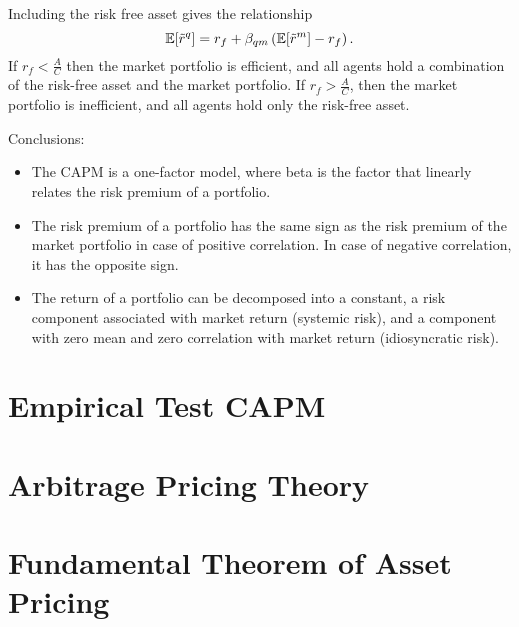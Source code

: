 \documentclass[twoside]{article}
\begin{document}
Including the risk free asset gives the relationship
\[
    \mathbb{E}[\tilde{r}^q] = r_f + \beta_{qm}\left(\mathbb{E}[\tilde{r}^m] - r_f\right).
\]
If $r_f < \frac{A}{C}$ then the market portfolio is efficient, and all agents hold a combination of the risk-free asset and the market portfolio. If $r_f > \frac{A}{C}$, then the market portfolio is inefficient, and all agents hold only the risk-free asset.

Conclusions:
\begin{itemize}
    \item The CAPM is a one-factor model, where beta is the factor that linearly relates the risk premium of a portfolio.
    \item The risk premium of a portfolio has the same sign as the risk premium of the market portfolio in case of positive correlation. In case of negative correlation, it has the opposite sign.
    \item The return of a portfolio can be decomposed into a constant, a risk component associated with market return (systemic risk), and a component with zero mean and zero correlation with market return (idiosyncratic risk).
\end{itemize}


\section{Empirical Test CAPM}


\section{Arbitrage Pricing Theory}


\section{Fundamental Theorem of Asset Pricing}
\end{document}
